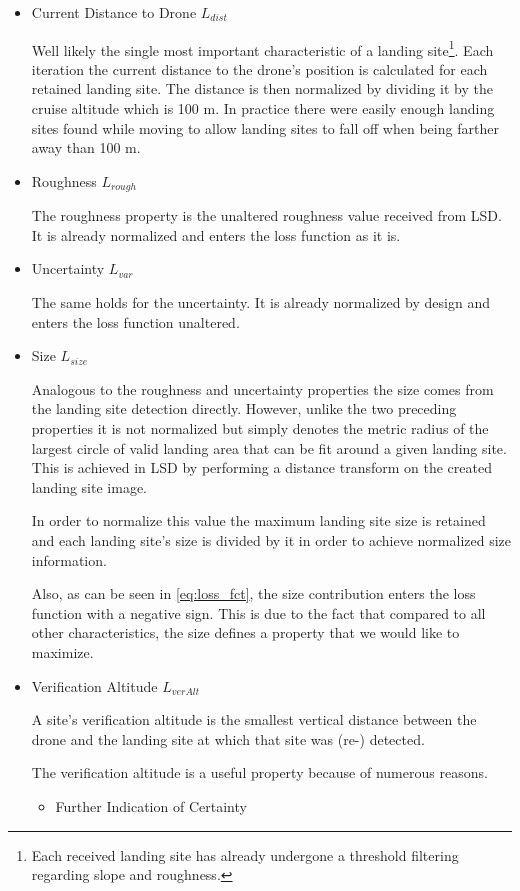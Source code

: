 \begin{itemize}
    \item Current Distance to Drone $L_{dist}$

    Well likely the single most important characteristic of a landing site\footnote[2]{Each received landing site has already undergone a threshold filtering regarding slope and roughness.}. Each iteration the current distance to the drone's position is calculated for each retained landing site. The distance is then normalized by dividing it by the cruise altitude which is 100 m. In practice there were easily enough landing sites found while moving to allow landing sites to fall off when being farther away than 100 m.
    \item Roughness $L_{rough}$

    The roughness property is the unaltered roughness value received from LSD. It is already normalized and enters the loss function as it is. 
    \item Uncertainty $L_{var}$

    The same holds for the uncertainty. It is already normalized by design and enters the loss function unaltered.
    \item Size $L_{size}$

    Analogous to the roughness and uncertainty properties the size comes from the landing site detection directly. However, unlike the two preceding properties it is not normalized but simply denotes the metric radius of the largest circle of valid landing area that can be fit around a given landing site. This is achieved in LSD by performing a distance transform on the created landing site image.

    In order to normalize this value the maximum landing site size is retained and each landing site's size is divided by it in order to achieve normalized size information.

    Also, as can be seen in \cref{eq:loss_fct}, the size contribution enters the loss function with a negative sign. This is due to the fact that compared to all other characteristics, the size defines a property that we would like to maximize.
    \item Verification Altitude $L_{verAlt}$

    A site's verification altitude is the smallest vertical distance between the drone and the landing site at which that site was (re-) detected. 

    The verification altitude is a useful property because of numerous reasons.
    \begin{itemize}
        \item Further Indication of Certainty


\end{itemize}
\end{itemize}
